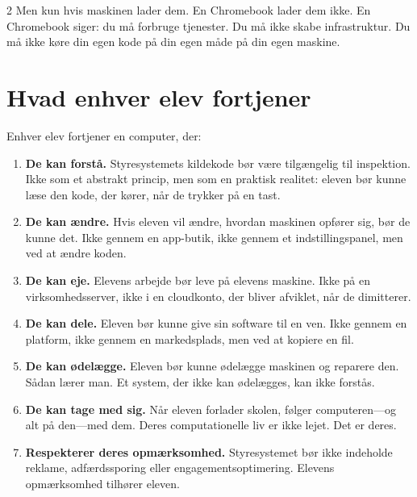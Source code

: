 \documentclass[11pt, a4paper]{article}
\begin{document}
\begin{multicols}{2}
Men kun hvis maskinen lader dem. En Chromebook lader dem ikke. En Chromebook siger: du må forbruge tjenester. Du må ikke skabe infrastruktur. Du må ikke køre din egen kode på din egen måde på din egen maskine.


\section{Hvad enhver elev fortjener}

Enhver elev fortjener en computer, der:

\begin{enumerate}
  \item \textbf{De kan forstå.} Styresystemets kildekode bør være tilgængelig til inspektion. Ikke som et abstrakt princip, men som en praktisk realitet: eleven bør kunne læse den kode, der kører, når de trykker på en tast.

  \item \textbf{De kan ændre.} Hvis eleven vil ændre, hvordan maskinen opfører sig, bør de kunne det. Ikke gennem en app-butik, ikke gennem et indstillingspanel, men ved at ændre koden.

  \item \textbf{De kan eje.} Elevens arbejde bør leve på elevens maskine. Ikke på en virksomhedsserver, ikke i en cloudkonto, der bliver afviklet, når de dimitterer.

  \item \textbf{De kan dele.} Eleven bør kunne give sin software til en ven. Ikke gennem en platform, ikke gennem en markedsplads, men ved at kopiere en fil.

  \item \textbf{De kan ødelægge.} Eleven bør kunne ødelægge maskinen og reparere den. Sådan lærer man. Et system, der ikke kan ødelægges, kan ikke forstås.

  \item \textbf{De kan tage med sig.} Når eleven forlader skolen, følger computeren---og alt på den---med dem. Deres computationelle liv er ikke lejet. Det er deres.

  \item \textbf{Respekterer deres opmærksomhed.} Styresystemet bør ikke indeholde reklame, adfærdssporing eller engagementsoptimering. Elevens opmærksomhed tilhører eleven.


\end{enumerate}
\end{multicols}
\end{document}
